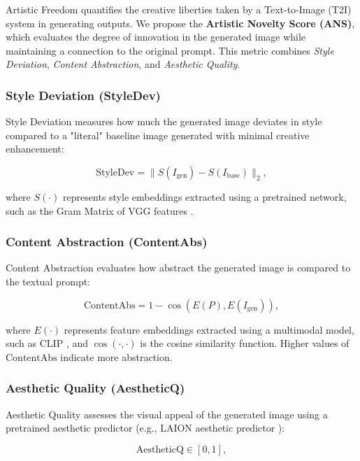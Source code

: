 Artistic Freedom quantifies the creative liberties taken by a Text-to-Image (T2I) system in generating outputs. We propose the \textbf{Artistic Novelty Score (ANS)}, which evaluates the degree of innovation in the generated image while maintaining a connection to the original prompt. This metric combines \textit{Style Deviation}, \textit{Content Abstraction}, and \textit{Aesthetic Quality}.

\subsubsection{Style Deviation (StyleDev)}
Style Deviation measures how much the generated image deviates in style compared to a "literal" baseline image generated with minimal creative enhancement:

\begin{equation}
\text{StyleDev} = \| S(I_{\text{gen}}) - S(I_{\text{base}}) \|_2,
\end{equation}

where \(S(\cdot)\) represents style embeddings extracted using a pretrained network, such as the Gram Matrix of VGG features \cite{gatys2016neural}.

\subsubsection{Content Abstraction (ContentAbs)}
Content Abstraction evaluates how abstract the generated image is compared to the textual prompt:

\begin{equation}
\text{ContentAbs} = 1 - \cos(E(P), E(I_{\text{gen}})),
\end{equation}

where \(E(\cdot)\) represents feature embeddings extracted using a multimodal model, such as CLIP \cite{radford2021learning}, and \(\cos(\cdot, \cdot)\) is the cosine similarity function. Higher values of \(\text{ContentAbs}\) indicate more abstraction.

\subsubsection{Aesthetic Quality (AestheticQ)}
Aesthetic Quality assesses the visual appeal of the generated image using a pretrained aesthetic predictor (e.g., LAION aesthetic predictor \cite{schuhmann2022laion}):

\begin{equation}
\text{AestheticQ} \in [0, 1],
\end{equation}

